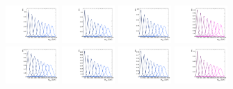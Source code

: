 \begin{figure}[htbp]
  \includegraphics[width=0.18\textwidth]{fig/2Dfit/templateSignalVsMX_fromDC_VBFGbuToWW_MVV_mu_HP_nobb_HDy.pdf}
  \includegraphics[width=0.18\textwidth]{fig/2Dfit/templateSignalVsMX_fromDC_VBFRadToWW_MVV_mu_HP_nobb_HDy.pdf}
  \includegraphics[width=0.18\textwidth]{fig/2Dfit/templateSignalVsMX_fromDC_VBFZprToWW_MVV_mu_HP_nobb_HDy.pdf}
  \includegraphics[width=0.18\textwidth]{fig/2Dfit/templateSignalVsMX_fromDC_VBFWprToWZ_MVV_mu_HP_nobb_HDy.pdf}\\
  \includegraphics[width=0.18\textwidth]{fig/2Dfit/templateSignalVsMX_fromDC_VBFGbuToWW_MVV_mu_LP_nobb_HDy.pdf}
  \includegraphics[width=0.18\textwidth]{fig/2Dfit/templateSignalVsMX_fromDC_VBFRadToWW_MVV_mu_LP_nobb_HDy.pdf}
  \includegraphics[width=0.18\textwidth]{fig/2Dfit/templateSignalVsMX_fromDC_VBFZprToWW_MVV_mu_LP_nobb_HDy.pdf}
  \includegraphics[width=0.18\textwidth]{fig/2Dfit/templateSignalVsMX_fromDC_VBFWprToWZ_MVV_mu_LP_nobb_HDy.pdf}\\

\end{figure}
